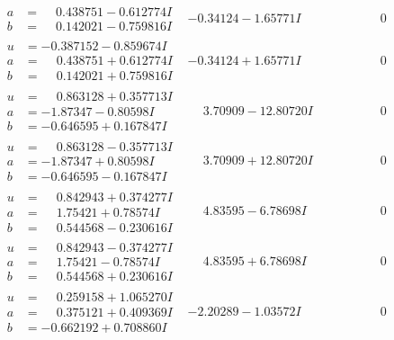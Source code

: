 \documentclass[1p]{elsarticle_modified}
\theoremstyle{definition}
\begin{document}
$$\begin{array}{c|c|c}
\begin{aligned}
a &= \phantom{-}0.438751 - 0.612774 I \\
b &= \phantom{-}0.142021 - 0.759816 I\end{aligned}
 & -0.34124 - 1.65771 I & \phantom{-0.000000 } 0 \\ \hline\begin{aligned}
u &= -0.387152 - 0.859674 I \\
a &= \phantom{-}0.438751 + 0.612774 I \\
b &= \phantom{-}0.142021 + 0.759816 I\end{aligned}
 & -0.34124 + 1.65771 I & \phantom{-0.000000 } 0 \\ \hline\begin{aligned}
u &= \phantom{-}0.863128 + 0.357713 I \\
a &= -1.87347 - 0.80598 I \\
b &= -0.646595 + 0.167847 I\end{aligned}
 & \phantom{-}3.70909 - 12.80720 I & \phantom{-0.000000 } 0 \\ \hline\begin{aligned}
u &= \phantom{-}0.863128 - 0.357713 I \\
a &= -1.87347 + 0.80598 I \\
b &= -0.646595 - 0.167847 I\end{aligned}
 & \phantom{-}3.70909 + 12.80720 I & \phantom{-0.000000 } 0 \\ \hline\begin{aligned}
u &= \phantom{-}0.842943 + 0.374277 I \\
a &= \phantom{-}1.75421 + 0.78574 I \\
b &= \phantom{-}0.544568 - 0.230616 I\end{aligned}
 & \phantom{-}4.83595 - 6.78698 I & \phantom{-0.000000 } 0 \\ \hline\begin{aligned}
u &= \phantom{-}0.842943 - 0.374277 I \\
a &= \phantom{-}1.75421 - 0.78574 I \\
b &= \phantom{-}0.544568 + 0.230616 I\end{aligned}
 & \phantom{-}4.83595 + 6.78698 I & \phantom{-0.000000 } 0 \\ \hline\begin{aligned}
u &= \phantom{-}0.259158 + 1.065270 I \\
a &= \phantom{-}0.375121 + 0.409369 I \\
b &= -0.662192 + 0.708860 I\end{aligned}
 & -2.20289 - 1.03572 I & \phantom{-0.000000 } 0 \\ \hline\begin{aligned}

\end{aligned}
\end{array}$$
\end{document}
